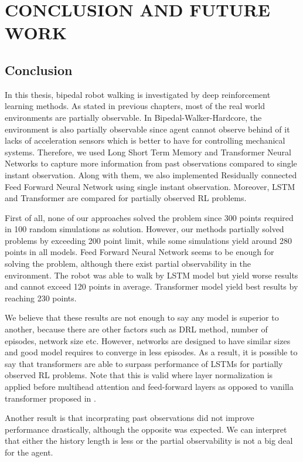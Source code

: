 \chapter{CONCLUSION AND FUTURE WORK}
\label{chap:conclusion}

\section{Conclusion}

In this thesis, bipedal robot walking is investigated by deep  reinforcement learning methods. As stated in previous chapters, most of the real world environments are partially observable. In Bipedal-Walker-Hardcore, the environment is also partially observable since agent cannot observe behind of it lacks of acceleration sensors which is better to have for controlling mechanical systems. Therefore, we used Long Short Term Memory and Transformer Neural Networks to capture more information from past observations compared to single instant observation. Along with them, we also implemented Residually connected Feed Forward Neural Network using single instant observation. Moreover, LSTM and Transformer are compared for partially observed RL problems. 

First of all, none of our approaches solved the problem since 300 points required in 100 random simulations as solution. However, our methods partially solved problems by exceeding 200 point limit, while some simulations yield around 280 points in all models. Feed Forward Neural Network seems to be enough for solving the problem, although there exist partial observability in the environment. The robot was able to walk by LSTM model but yield worse results and cannot exceed 120 points in average. Transformer model yield best results by reaching 230 points. 

We believe that these results are not enough to say any model is superior to another, because there are other factors such as DRL method, number of episodes, network size etc. However, networks are designed to have similar sizes and good model requires to converge in less episodes. As a result, it is possible to say that transformers are able to surpass performance of LSTMs for partially observed RL problems. Note that this is valid where layer normalization is applied before multihead attention and feed-forward layers \cite{xiong_layer_2020} as opposed to vanilla transformer proposed in \cite{vaswani_attention_2017}.

Another result is that incorprating past observations did not improve performance drastically, although the opposite was expected. We can interpret that either the history length is less or the partial observability is not a big deal for the agent. 

